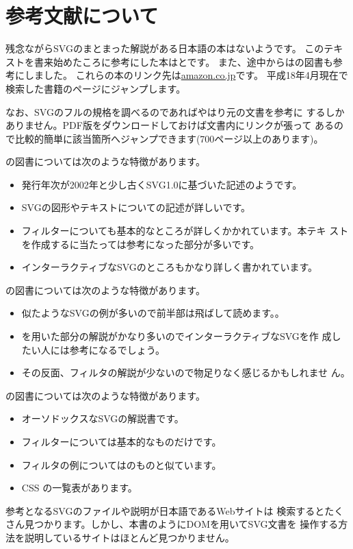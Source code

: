 \chapter{参考文献について}
残念ながらSVGのまとまった解説がある日本語の本はないようです。
このテキストを書来始めたころに参考にした本は\cite{Cagle}と\cite{Campesato}です。
また、途中からは\cite{Eisenberg}の図書も参考にしました。
これらの本のリンク先は\href{http://www.amazon.co.jp}{amazon.co.jp}です。
平成18年4月現在で検索した書籍のページにジャンプします。

なお、SVGのフルの規格を調べるのであればやはり元の文書\cite{SVG11}を参考に
するしかありません。PDF版をダウンロードしておけば文書内にリンクが張って
あるので比較的簡単に該当箇所へジャンプできます(700ページ以上のあります)。

\cite{Cagle}の図書については次のような特徴があります。
\begin{itemize}
 \item 発行年次が2002年と少し古くSVG1.0に基づいた記述のようです。
 \item SVGの図形やテキストについての記述が詳しいです。
 \item フィルターについても基本的なところが詳しくかかれています。本テキ
       ストを作成するに当たっては参考になった部分が多いです。
 \item インターラクティブなSVGのところもかなり詳しく書かれています。
\end{itemize}

\cite{Campesato}の図書については次のような特徴があります。
\begin{itemize}
 \item 似たようなSVGの例が多いので前半部は飛ばして読めます。。
 \item \JS を用いた部分の解説がかなり多いのでインターラクティブなSVGを作
       成したい人には参考になるでしょう。
 \item その反面、フィルタの解説が少ないので物足りなく感じるかもしれませ
       ん。
\end{itemize}

\cite{Eisenberg}の図書については次のような特徴があります。
\begin{itemize}
 \item オーソドックスなSVGの解説書です。
 \item フィルターについては基本的なものだけです。
 \item フィルタの例については\cite{SVG11}のものと似ています。
 \item CSS の一覧表があります。
\end{itemize}
参考となるSVGのファイルや説明が日本語であるWebサイトは
検索するとたくさん見つかります。しかし、本書のようにDOMを用いてSVG文書を
操作する方法を説明しているサイトはほとんど見つかりません。


